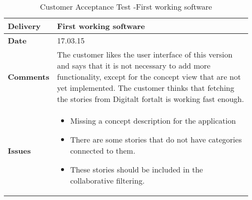 \renewcommand{\arraystretch}{2}%
\begin{center}
	\begin{longtable}{ | p{4cm} | p{13cm} | }
		
		\caption[Customer Acceptance test]{Customer Acceptance Test -First working software } \label{Tab:cattest3}\\
		\hline
		\textbf{Delivery} & First working software\\ \hline
		\textbf{Date} & 17.03.15 \\ \hline
		\textbf{Comments} & The customer likes the user interface of this version and says that it is not necessary to add more functionality, except for the concept view that are not yet implemented. The customer thinks that fetching the stories from Digitalt fortalt is working fast enough.  \\ \hline			
		\textbf{Issues} & 
		\begin{itemize}[noitemsep]
			
			\item Missing a concept description for the application 
			\item There are some stories that do not have categories connected to them. 
			\item These stories should be included in the collaborative filtering.
		\end{itemize}
		\\ \hline		
	\end{longtable}
\end{center}

